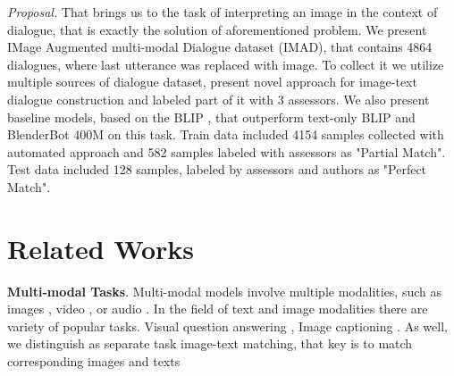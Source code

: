 \documentclass[11pt]{article}
\begin{document}
\textit{Proposal.} That brings us to the task of interpreting an image in the context of dialogue, that is exactly the solution of aforementioned problem. We present IMage Augmented multi-modal Dialogue dataset (IMAD), that contains 4864 dialogues, where last utterance was replaced with image. To collect it we utilize multiple sources of dialogue dataset, present novel approach for image-text dialogue construction and labeled part of it with 3 assessors. We also present baseline models, based on the BLIP \cite{blip}, that outperform text-only BLIP and BlenderBot 400M  \cite{blenderbot} on this task. Train data included 4154 samples collected with automated approach and 582 samples labeled with assessors as "Partial Match". Test data included 128 samples, labeled by assessors and authors as "Perfect Match". 





\section{Related Works}

\textbf{Multi-modal Tasks}. Multi-modal models involve multiple modalities, such as images \cite{blip,Dalle,sim-vlm,VinVl}, video \cite{frozen,video-qa,VideoCoCa}, or audio \cite{flow-tron,natural-speech}. In the field of text and image modalities there are variety of popular tasks. Visual question answering \cite{blip2,blip,ALBEF,ALIGN}, Image captioning \cite{kumar2022imagecaptioning,OFA,mPLUG}. As well, we distinguish as separate task image-text matching, that key is to match corresponding images and texts \cite{Radford-2021,blip,bridge-towers}
\end{document}
